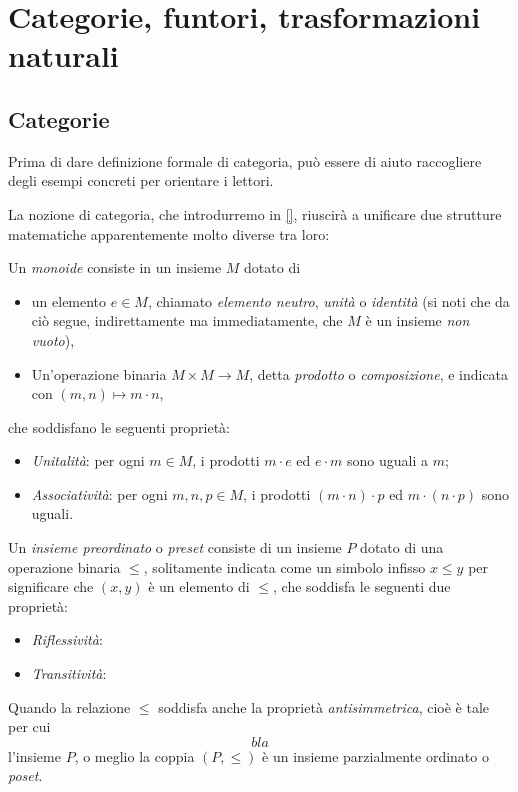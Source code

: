\chapter{Categorie, funtori, trasformazioni naturali}

\section{Categorie}\label{categorie}

Prima di dare definizione formale di categoria, può essere di aiuto raccogliere degli esempi concreti per orientare i lettori.

La nozione di categoria, che introdurremo in \autoref{}, riuscirà a unificare due strutture matematiche apparentemente molto diverse tra loro:
\begin{definition}
    Un \emph{monoide} consiste in un insieme $M$ dotato di
    \begin{itemize}
     \item un elemento $e\in M$, chiamato \emph{elemento neutro}, \emph{unità} o \emph{identità} (si noti che da ciò segue, indirettamente ma immediatamente, che $M$ è un insieme \emph{non vuoto}),
     \item Un'operazione binaria $M\times M\to M$, detta \emph{prodotto} o \emph{composizione}, e indicata con $(m,n)\mapsto m\cdot n$,
    \end{itemize}
    che soddisfano le seguenti proprietà:
    \begin{itemize}
     \item \emph{Unitalità}: per ogni $m\in M$, i prodotti $m \cdot e$ ed $e\cdot m$ sono uguali a $m$;
     \item \emph{Associatività}: per ogni $m,n,p\in M$, i prodotti $(m\cdot n)\cdot p$ ed $m\cdot (n\cdot p)$ sono uguali.
    \end{itemize}
   \end{definition}
\begin{definition}
    Un \emph{insieme preordinato} o \emph{preset} consiste di un insieme $P$ dotato di una operazione binaria $\le$, solitamente indicata come un simbolo infisso $x\le y$ per significare che $(x,y)$ è un elemento di $\le$, che soddisfa le seguenti due proprietà:
    \begin{itemize}
        \item \emph{Riflessività}: \Todo{}
        \item \emph{Transitività}: \Todo{}
    \end{itemize}
    Quando la relazione $\le$ soddisfa anche la proprietà \emph{antisimmetrica}, cioè è tale per cui
    \[bla\]
    l'insieme $P$, o meglio la coppia $(P,\le)$ è un insieme parzialmente ordinato o \emph{poset}.
\end{definition}
